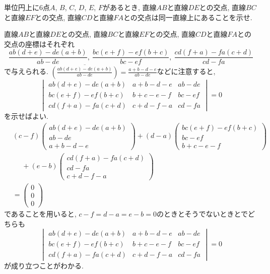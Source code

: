 \begin{bprb}[Pascalの定理]
単位円上に$6$点$A$, $B$, $C$, $D$, $E$, $F$があるとき, 直線$AB$と直線$DE$との交点, 直線$BC$と直線$EF$との交点, 直線$CD$と直線$FA$との交点は同一直線上にあることを示せ.
\end{bprb}
\begin{ifsol*}
直線$AB$と直線$DE$との交点, 直線$BC$と直線$EF$との交点, 直線$CD$と直線$FA$との交点の座標はそれぞれ
\[\frac{ab(d+e)-de(a+b)}{ab-de},\ \frac{bc(e+f)-ef(b+c)}{bc-ef},\ \frac{cd(f+a)-fa(c+d)}{cd-fa}\]
で与えられる.
$\overline{(\frac{ab(d+e)-de(a+b)}{ab-de})}=\frac{a+b-d-e}{ab-de}$などに注意すると,
\[\begin{vmatrix}
ab(d+e)-de(a+b)&a+b-d-e&ab-de\\
bc(e+f)-ef(b+c)&b+c-e-f&bc-ef\\
cd(f+a)-fa(c+d)&c+d-f-a&cd-fa
\end{vmatrix}
=0\]
を示せばよい.
\begin{align*}
&(c-f)\begin{pmatrix}ab(d+e)-de(a+b)\\ab-de\\a+b-d-e\end{pmatrix}
+(d-a)\begin{pmatrix}bc(e+f)-ef(b+c)\\bc-ef\\b+c-e-f\end{pmatrix}\\
&\phantom{{}={}}+(e-b)\begin{pmatrix}cd(f+a)-fa(c+d)\\cd-fa\\c+d-f-a\end{pmatrix}\\
&=\begin{pmatrix}0\\0\\0\end{pmatrix}
\end{align*}
であることを用いると, $c-f=d-a=e-b=0$のときとそうでないときとでどちらも
\[\begin{vmatrix}
ab(d+e)-de(a+b)&a+b-d-e&ab-de\\
bc(e+f)-ef(b+c)&b+c-e-f&bc-ef\\
cd(f+a)-fa(c+d)&c+d-f-a&cd-fa
\end{vmatrix}
=0\]
が成り立つことがわかる.
\end{ifsol*}